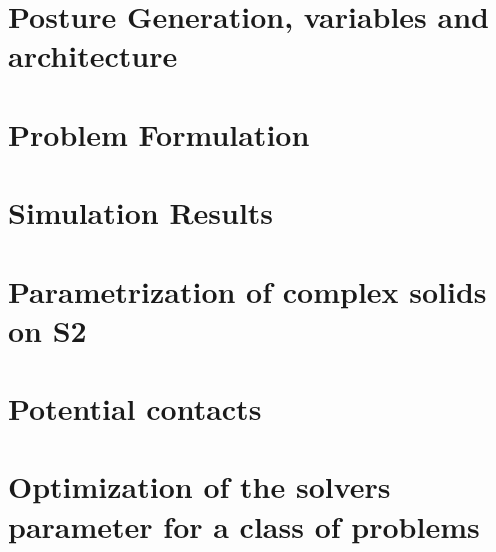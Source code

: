 \section{Posture Generation, variables and architecture}
\label{sec:posture_generation_variables_and_architecture}

\section{Problem Formulation}
\label{sec:problem_formulation}

\section{Simulation Results}
\label{sec:simulation_results}

\section{Parametrization of complex solids on S2}
\label{sec:parametrization_of_complex_solids_on_s2}

\section{Potential contacts}
\label{sec:potential_contacts}

\section{Optimization of the solvers parameter for a class of problems}
\label{sec:optimization_of_the_solvers_parameter_for_a_class_of_problems}
